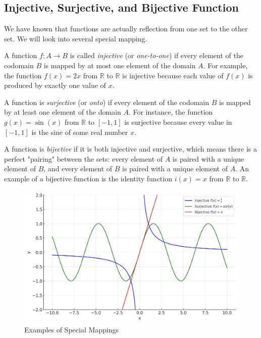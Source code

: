 \subsection{Injective, Surjective, and Bijective Function}
We have known that functions are actually reflection from one set to the other set. We will look into several special mapping.

\begin{definition}
    A function \( f: A \to B \) is called \emph{injective} (or \emph{one-to-one}) if every element of the codomain \( B \) is mapped by at most one element of the domain \( A \). For example, the function \( f(x) = 2x \) from \( \mathbb{R} \) to \( \mathbb{R} \) is injective because each value of \( f(x) \) is produced by exactly one value of \( x \).
\end{definition}

\begin{definition}
    A function is \emph{surjective} (or \emph{onto}) if every element of the codomain \( B \) is mapped by at least one element of the domain \( A \). For instance, the function \( g(x) = \sin(x) \) from \( \mathbb{R} \) to \( [-1, 1] \) is surjective because every value in \( [-1, 1] \) is the sine of some real number \( x \).
\end{definition}

\begin{definition}
    A function is \emph{bijective} if it is both injective and surjective, which means there is a perfect "pairing" between the sets: every element of \( A \) is paired with a unique element of \( B \), and every element of \( B \) is paired with a unique element of \( A \). An example of a bijective function is the identity function \( i(x) = x \) from \( \mathbb{R} \) to \( \mathbb{R} \).
\end{definition}

\begin{figure}[H]
    \centering
    \includegraphics[width=0.75\linewidth]{Images/func.jpg}
    \caption{Examples of Special Mappings}
    \label{fig:fuc}
\end{figure}

